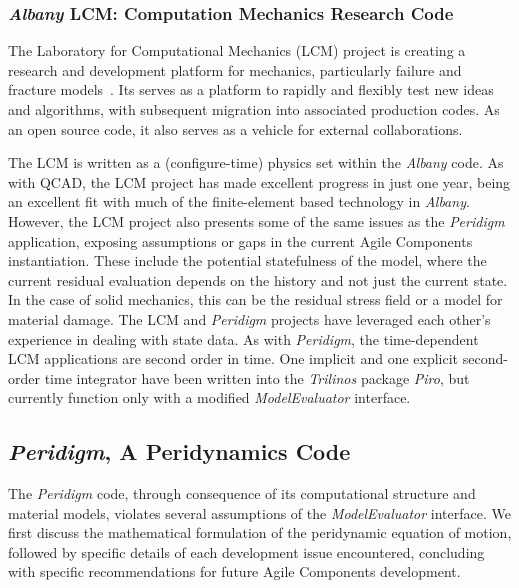 \documentclass[pdf,ps2pdf,12pt,report]{SANDreport}
\theoremstyle{plain}
\theoremstyle{definition}
\theoremstyle{remark}
\numberwithin{equation}{section}
\begin{document}
\subsubsection{\emph{Albany} LCM: Computation Mechanics Research Code} \label{sec:albany:lcm}

The Laboratory for Computational Mechanics (LCM) project is creating a research and development platform for mechanics, particularly failure and fracture models~\cite{LCMWebPage:2011}. Its serves as a platform to rapidly and flexibly test new ideas and algorithms, with subsequent migration into associated production codes. As an open source code, it also serves as a vehicle for external collaborations.

The LCM is written as a (configure-time) physics set within the \emph{Albany} code. As with QCAD, the LCM project has made excellent progress in just one year, being an excellent fit with much of the finite-element based technology in \emph{Albany}. However, the LCM project also presents some of the same issues as the \emph{Peridigm} application, exposing assumptions or gaps in the current Agile Components instantiation. These include the potential statefulness of the model, where the current residual evaluation depends on the history and not just the current state. In the case of solid mechanics, this can be the residual stress field or a model for material damage. The LCM and \emph{Peridigm} projects have leveraged each other's experience in dealing with state data. As with \emph{Peridigm}, the time-dependent LCM applications are second order in time. One implicit and one explicit second-order time integrator have been written into the \emph{Trilinos} package \emph{Piro}, but currently function only with a modified \emph{ModelEvaluator} interface.

\subsection{\emph{Peridigm}, A Peridynamics Code} \label{sec:peridigm}

The \emph{Peridigm} code, through consequence of its computational structure and material models, violates several assumptions of the \emph{ModelEvaluator} interface. We first discuss the mathematical formulation of the peridynamic equation of motion, followed by specific details of each development issue encountered, concluding with specific recommendations for future Agile Components development.
\end{document}

